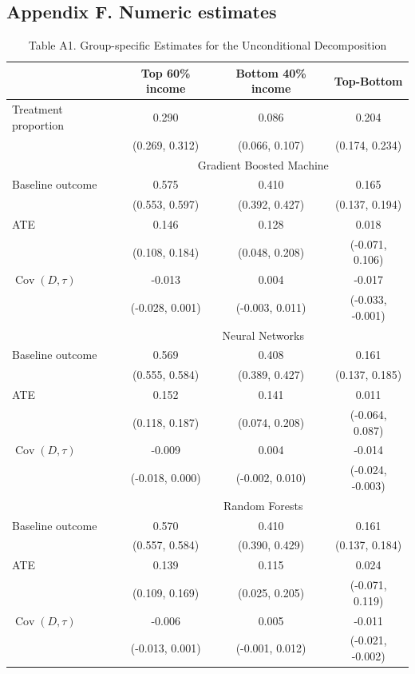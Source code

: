 \documentclass[12pt,a4paper]{article}
\newcommand{\Cov}{\operatorname{Cov}}
\begin{document}
\subsection*{Appendix F. Numeric estimates}
\begin{table}[htbp]
\centering
\caption*{Table A1. Group-specific Estimates for the Unconditional Decomposition} 
\begin{tabular}{lccc}
  \hline
   &  Top 60\% income & Bottom 40\% income  & Top-Bottom \\ 
  \hline
  Treatment proportion & 0.290 & 0.086 & 0.204 \\ 
   & (0.269, 0.312) & (0.066, 0.107) & (0.174, 0.234) \\
  & \multicolumn{3}{c}{Gradient Boosted Machine}  \\
  Baseline outcome & 0.575 & 0.410 & 0.165 \\ 
   & (0.553, 0.597) & (0.392, 0.427) & (0.137, 0.194) \\
  ATE & 0.146 & 0.128 & 0.018 \\ 
  & (0.108, 0.184) & (0.048, 0.208) & (-0.071, 0.106) \\
  $\Cov(D, \tau)$ & -0.013 & 0.004 & -0.017 \\ 
  & (-0.028, 0.001) & (-0.003, 0.011) & (-0.033, -0.001) \\
  & \multicolumn{3}{c}{Neural Networks}  \\
  Baseline outcome & 0.569 & 0.408 & 0.161 \\ 
  & (0.555, 0.584) & (0.389, 0.427) & (0.137, 0.185) \\
  ATE & 0.152 & 0.141 & 0.011 \\ 
  & (0.118, 0.187) & (0.074, 0.208) & (-0.064, 0.087) \\
  $\Cov(D, \tau)$ & -0.009 & 0.004 & -0.014 \\ 
  & (-0.018, 0.000) & (-0.002, 0.010) & (-0.024, -0.003) \\
  & \multicolumn{3}{c}{Random Forests}  \\
  Baseline outcome & 0.570 & 0.410 & 0.161 \\ 
  & (0.557, 0.584) & (0.390, 0.429) & (0.137, 0.184) \\
  ATE & 0.139 & 0.115 & 0.024 \\ 
  & (0.109, 0.169) & (0.025, 0.205) & (-0.071, 0.119) \\
  $\Cov(D, \tau)$ & -0.006 & 0.005 & -0.011 \\ 
  & (-0.013, 0.001) & (-0.001, 0.012) & (-0.021, -0.002) \\

\end{tabular}
\end{table}
\end{document}
